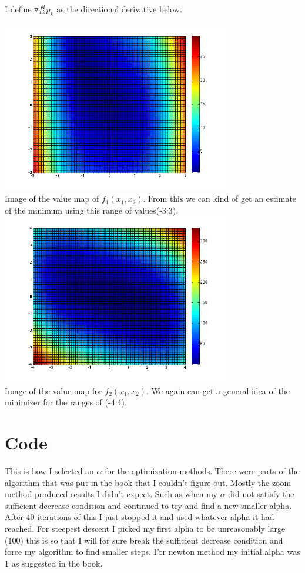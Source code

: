 \documentclass[7pt]{article}
\begin{document}
	I define $\triangledown f_k^T p_k$ as the directional derivative below. 
	\begin{center}
	\includegraphics[width = 10cm]{fx1}\\
	Image of the value map of $f_1(x_1,x_2)$. From this we can kind of get an estimate of the minimum using this range of values(-3:3).\\
	\includegraphics[width = 10cm]{fx2}\\
	Image of the value map for $f_2(x_1,x_2)$. We again can get a general idea of the minimizer for the ranges of (-4:4). 
\end{center}
	
	\section{Code} 
	This is how I selected an $\alpha$ for the optimization methods. 
	There were parts of the algorithm that was put in the book that I couldn't figure out. Mostly the zoom method produced results I didn't expect. Such as when my $\alpha$ did not satisfy the sufficient decrease condition and continued to try and find a new smaller alpha. After 40 iterations of this I just stopped it and used whatever alpha it had reached. For steepest descent I picked my first alpha to be unreasonably large (100) this is so that I will for sure break the sufficient decrease condition and force my algorithm to find smaller steps. For newton method my initial alpha was 1 as suggested in the book.\\
	
\end{document}
